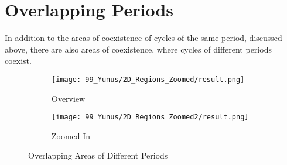 \section{Overlapping Periods}

In addition to the areas of coexistence of cycles of the same period, discussed above, there are also areas of coexistence, where cycles of different periods coexist.

\begin{figure}
    \centering
    \begin{subfigure}{0.4\textwidth}
        \texttt{[image: 99\_Yunus/2D\_Regions\_Zoomed/result.png]}
        \caption{Overview}
    \end{subfigure}
    \begin{subfigure}{0.4\textwidth}
        \texttt{[image: 99\_Yunus/2D\_Regions\_Zoomed2/result.png]}
        \caption{Zoomed In}
    \end{subfigure}
    \caption{Overlapping Areas of Different Periods}
\end{figure}

